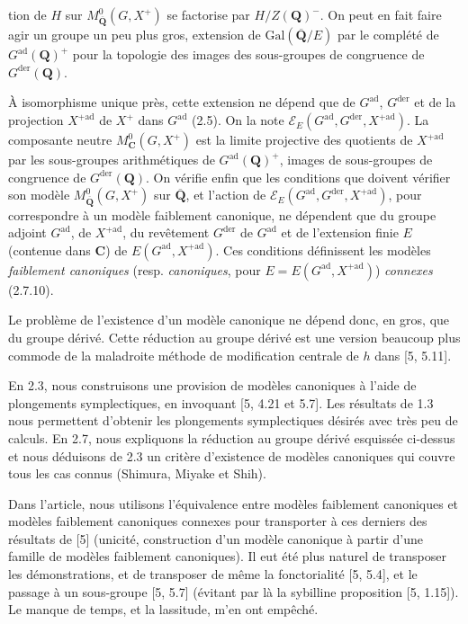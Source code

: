 \documentclass[10pt,a4paper]{article}
\newcommand{\SourcePage}[2]{\clearpage\setcounter{page}{#2}\typeout{D031_SOURCE_PAGE physical=#1 printed=#2}}
\begin{document}
\SourcePage{4}{250}
tion de \(H\) sur \(M^0_{\overline{\mathbf Q}}(G,X^+)\) se factorise par \(H/Z(\mathbf Q)^-\). On peut en fait faire agir un groupe un peu plus gros, extension de \(\mathrm{Gal}(\overline{\mathbf Q}/E)\) par le complété de \(G^{\mathrm{ad}}(\mathbf Q)^+\) pour la topologie des images des sous-groupes de congruence de \(G^{\mathrm{der}}(\mathbf Q)\).

À isomorphisme unique près, cette extension ne dépend que de \(G^{\mathrm{ad}}\), \(G^{\mathrm{der}}\) et de la projection \(X^{+\mathrm{ad}}\) de \(X^+\) dans \(G^{\mathrm{ad}}\) (2.5). On la note \(\mathscr E_E(G^{\mathrm{ad}},G^{\mathrm{der}},X^{+\mathrm{ad}})\). La composante neutre \(M^0_{\mathbf C}(G,X^+)\) est la limite projective des quotients de \(X^{+\mathrm{ad}}\) par les sous-groupes arithmétiques de \(G^{\mathrm{ad}}(\mathbf Q)^+\), images de sous-groupes de congruence de \(G^{\mathrm{der}}(\mathbf Q)\). On vérifie enfin que les conditions que doivent vérifier son modèle \(M^0_{\overline{\mathbf Q}}(G,X^+)\) sur \(\overline{\mathbf Q}\), et l'action de \(\mathscr E_E(G^{\mathrm{ad}},G^{\mathrm{der}},X^{+\mathrm{ad}})\), pour correspondre à un modèle faiblement canonique, ne dépendent que du groupe adjoint \(G^{\mathrm{ad}}\), de \(X^{+\mathrm{ad}}\), du revêtement \(G^{\mathrm{der}}\) de \(G^{\mathrm{ad}}\) et de l'extension finie \(E\) (contenue dans \(\mathbf C\)) de \(E(G^{\mathrm{ad}},X^{+\mathrm{ad}})\). Ces conditions définissent les modèles \emph{faiblement canoniques} (resp. \emph{canoniques}, pour \(E=E(G^{\mathrm{ad}},X^{+\mathrm{ad}})\)) \emph{connexes} (2.7.10).

Le problème de l'existence d'un modèle canonique ne dépend donc, en gros, que du groupe dérivé. Cette réduction au groupe dérivé est une version beaucoup plus commode de la maladroite méthode de modification centrale de \(h\) dans {[}5, 5.11{]}.

En 2.3, nous construisons une provision de modèles canoniques à l'aide de plongements symplectiques, en invoquant {[}5, 4.21 et 5.7{]}. Les résultats de 1.3 nous permettent d'obtenir les plongements symplectiques désirés avec très peu de calculs. En 2.7, nous expliquons la réduction au groupe dérivé esquissée ci-dessus et nous déduisons de 2.3 un critère d'existence de modèles canoniques qui couvre tous les cas connus (Shimura, Miyake et Shih).

Dans l'article, nous utilisons l'équivalence entre modèles faiblement canoniques et modèles faiblement canoniques connexes pour transporter à ces derniers des résultats de {[}5{]} (unicité, construction d'un modèle canonique à partir d'une famille de modèles faiblement canoniques). Il eut été plus naturel de transposer les démonstrations, et de transposer de même la fonctorialité {[}5, 5.4{]}, et le passage à un sous-groupe {[}5, 5.7{]} (évitant par là la sybilline proposition {[}5, 1.15{]}). Le manque de temps, et la lassitude, m'en ont empêché.
\end{document}
